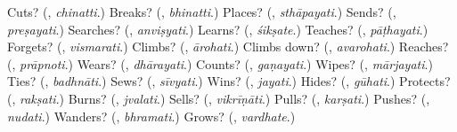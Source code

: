 \begin{tcolorbox}[breakable,colback=teal!4,colframe=teal!35!black,title={Before you move on}]
Cuts? (\textbf{}, \emph{chinatti}.) Breaks? (\textbf{}, \emph{bhinatti}.) Places? (\textbf{}, \emph{sthāpayati}.) Sends? (\textbf{}, \emph{preṣayati}.) Searches? (\textbf{}, \emph{anviṣyati}.) Learns? (\textbf{}, \emph{śikṣate}.) Teaches? (\textbf{}, \emph{pāṭhayati}.) Forgets? (\textbf{}, \emph{vismarati}.) Climbs? (\textbf{}, \emph{ārohati}.) Climbs down? (\textbf{}, \emph{avarohati}.) Reaches? (\textbf{}, \emph{prāpnoti}.) Wears? (\textbf{}, \emph{dhārayati}.) Counts? (\textbf{}, \emph{gaṇayati}.) Wipes? (\textbf{}, \emph{mārjayati}.) Ties? (\textbf{}, \emph{badhnāti}.) Sews? (\textbf{}, \emph{sīvyati}.) Wins? (\textbf{}, \emph{jayati}.) Hides? (\textbf{}, \emph{gūhati}.) Protects? (\textbf{}, \emph{rakṣati}.) Burns? (\textbf{}, \emph{jvalati}.) Sells? (\textbf{}, \emph{vikrīṇāti}.) Pulls? (\textbf{}, \emph{karṣati}.) Pushes? (\textbf{}, \emph{nudati}.) Wanders? (\textbf{}, \emph{bhramati}.) Grows? (\textbf{}, \emph{vardhate}.)
\end{tcolorbox}
